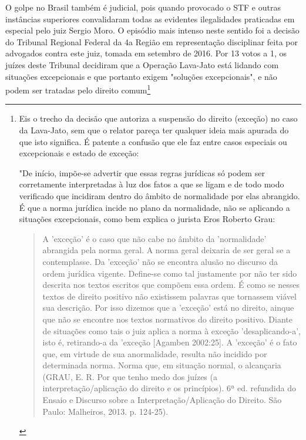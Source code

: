 O golpe no Brasil também é judicial, pois quando provocado o STF e
outras instâncias superiores convalidaram todas as evidentes
ilegalidades praticadas em especial pelo juiz Sergio Moro. O episódio
mais intenso neste sentido foi a decisão do Tribunal Regional Federal da
4a Região em representação disciplinar feita por advogados contra este
juiz, tomada em setembro de 2016. Por 13 votos a 1, os juízes deste
Tribunal decidiram que a Operação Lava-Jato está lidando com situações
excepcionais e que portanto exigem "soluções excepcionais", e não podem
ser tratadas pelo direito comum\footnote{Eis o trecho da decisão que
  autoriza a suspensão do direito (exceção) no caso da Lava-Jato, sem
  que o relator pareça ter qualquer ideia mais apurada do que isto
  significa. É patente a confusão que ele faz entre casos especiais ou
  excepcionais e estado de exceção:

  "De início, impõe-se advertir que essas regras jurídicas só podem ser
  corretamente interpretadas à luz dos fatos a que se ligam e de todo
  modo verificado que incidiram dentro do âmbito de normalidade por elas
  abrangido. É que a norma jurídica incide no plano da normalidade, não
  se aplicando a situações excepcionais, como bem explica o jurista Eros
  Roberto Grau:

  \begin{quote}
  A 'exceção' é o caso que não cabe no âmbito da 'normalidade' abrangida
  pela norma geral. A norma geral deixaria de ser geral se a
  contemplasse. Da 'exceção' não se encontra alusão no discurso da ordem
  jurídica vigente. Define-se como tal justamente por não ter sido
  descrita nos textos escritos que compõem essa ordem. É como se nesses
  textos de direito positivo não existissem palavras que tornassem
  viável sua descrição. Por isso dizemos que a 'exceção' está no
  direito, ainque que não se encontre nos textos normativos do direito
  positivo. Diante de situações como tais o juiz aplica a norma à
  exceção 'desaplicando-a', isto é, retirando-a da 'exceção {[}Agamben
  2002:25{]}. A 'exceção' é o fato que, em virtude de sua anormalidade,
  resulta não incidido por determinada norma. Norma que, em situação
  normal, o alcançaria (GRAU, E. R. Por que tenho medo dos juízes (a
  interpretação/aplicação do direito e os princípios). 6ª ed. refundida
  do Ensaio e Discurso sobre a Interpretação/Aplicação do Direito. São
  Paulo: Malheiros, 2013. p. 124-25).
  \end{quote}

}
